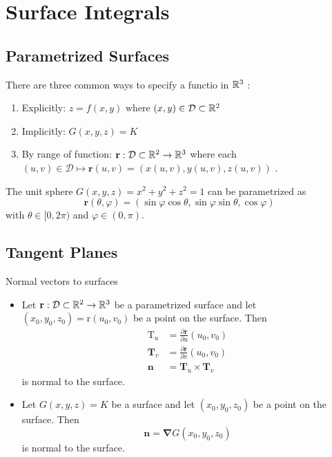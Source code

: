 \chapter{Surface Integrals}
\section{Parametrized Surfaces}
There are three common ways to specify a functio in $\mathbb{R}^{3}$ :
\begin{enumerate}
	\item Explicitly: $z = f(x,y)$ where $(x,y)\in\mathcal{D} \subset \mathbb{R}^{2}$
	\item Implicitly: $G(x,y,z) = K$
	\item By range of function:  $\mathbf{r}:\mathcal{D}\subset \mathbb{R}^{2}\to\mathbb{R}^{3}$ 
		where each $(u,v)\in\mathcal{D}\mapsto \mathbf{r}(u,v) = (x(u,v),y(u,v),z(u,v))$ .
\end{enumerate}
\begin{eg}
	The unit sphere $G(x,y,z) = x^2 + y^2 + z^2 = 1$ can be parametrized as 
	\[
		\mathbf{r}(\theta,\varphi) = (\sin\varphi\cos\theta,\sin\varphi\sin\theta,\cos\varphi)
	\] 
	with $\theta\in[0,2\pi)$ and $\varphi\in(0,\pi)$.
\end{eg}	
\section{Tangent Planes}
\begin{theorem}
	Normal vectors to surfaces
	\begin{itemize}
		\item Let $\mathbf{r} : \mathcal{D}\subset \mathbb{R}^{2}\to\mathbb{R}^{3}$ be a parametrized surface and let $(x_0,y_0,z_0)=\mathrm{r}(u_0,v_0)$ be a point on the surface. Then
			\begin{align*}
				\mathrm{T}_u &= \frac{\partial \mathbf{r}}{\partial u} (u_0,v_0)\\
				\mathbf{T}_v &= \frac{\partial \mathbf{r}}{\partial v} (u_0,v_0)\\
				\mathbf{n} &= \mathbf{T}_u \times \mathbf{T}_v
			\end{align*}
			is normal to the surface.
		\item Let $G(x,y,z)=K$ be a surface and let $(x_0,y_0,z_0)$ be a point on the surface. Then 
			\[
				\mathbf{n} = \bm{\nabla}G(x_0,y_0,z_0)
			\] 
			is normal to the surface.
	\end{itemize}
\end{theorem}
